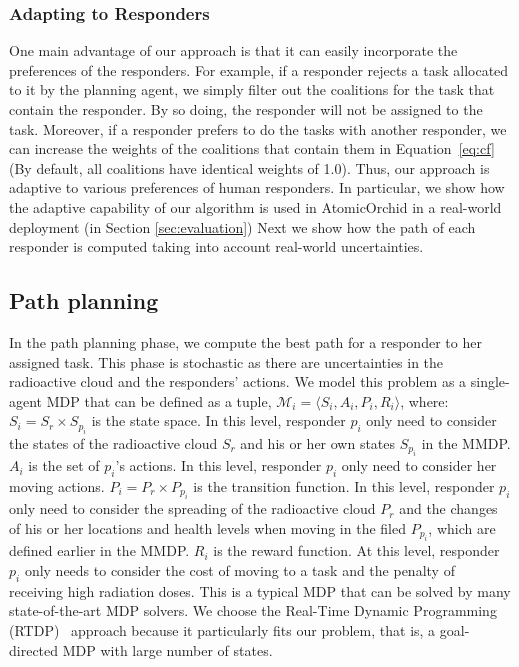 \subsubsection{Adapting to Responders}\label{sec:adaptive}
One main advantage of our approach is that it can easily
incorporate the preferences of the responders. For example, if a
responder rejects  a task allocated to it by the planning agent, we
simply filter out the coalitions for the task that contain the
responder. By so doing, the responder will not be assigned to the
task. Moreover, if a responder prefers to do the tasks with another
responder, we can increase the weights of the coalitions that
contain them in Equation~\ref{eq:cf} (By default, all coalitions
have identical weights of 1.0). Thus, our approach is adaptive to
various preferences of human responders. In particular, we show how
the adaptive capability of our algorithm is used in AtomicOrchid in
a real-world deployment (in Section \ref{sec:evaluation}) Next we
show how the path of each responder is computed taking into account
real-world uncertainties.

\subsection{Path planning}
\label{sec:pathplanning}

\noindent In the path planning phase, we compute the best path for
a responder to her assigned task. This phase is stochastic as there
are uncertainties in the radioactive cloud and the responders'
actions. We model this problem as a single-agent MDP that can be
defined as a tuple, $\mathcal{M}_i = \langle S_i, A_i, P_i, R_i
\rangle$, where: $S_i = S_r \times S_{p_i}$ is the state space. In
this level, responder $p_i$ only need to consider the states of the
radioactive cloud $S_r$ and his or her own states $S_{p_i}$ in the
MMDP. $A_i$ is the set of $p_i$'s actions. In this level, responder
$p_i$ only need to consider her moving actions. $P_i = P_r \times
P_{p_i}$ is the transition function. In this level, responder $p_i$
only need to consider the spreading of the radioactive cloud $P_r$
and the changes of his or her locations and health levels when
moving in the filed $P_{p_i}$, which are defined earlier in the
MMDP. $R_i$ is the reward function. At this level, responder $p_i$
only needs to consider the cost of moving to a task and the penalty
of receiving high radiation doses. This is a typical MDP that can
be solved by many state-of-the-art MDP solvers. We choose the
Real-Time Dynamic Programming (RTDP)~\cite{barto1995learning}
approach because it particularly fits  our problem, that is, a
goal-directed MDP with large number of states.

